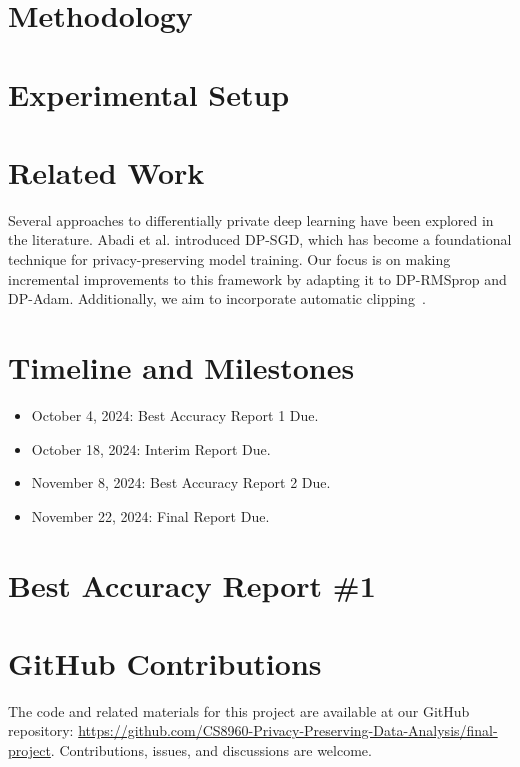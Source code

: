 \documentclass{article}
\begin{document}
    \section{Methodology}\label{sec:methodology}
    

    \break
    \section{Experimental Setup}\label{sec:experimental-setup}
    

    \section{Related Work}\label{sec:related-work}
    Several approaches to differentially private deep learning have been explored in the literature.
    Abadi et al. \cite{Abadi_2016_DeepLearningDifferentialPrivacy} introduced DP-SGD, which has become a foundational technique for
    privacy-preserving model training.
    Our focus is on making incremental improvements to this framework by adapting it to DP-RMSprop and DP-Adam.
    Additionally, we aim to incorporate automatic clipping~\cite{bu2023automaticclippingdifferentiallyprivate}.


    \section{Timeline and Milestones}\label{sec:timeline-and-milestones}
    \begin{itemize}
        \item October 4, 2024: Best Accuracy Report 1 Due.
        \item October 18, 2024: Interim Report Due.
        \item November 8, 2024: Best Accuracy Report 2 Due.
        \item November 22, 2024: Final Report Due.
    \end{itemize}

    \section{Best Accuracy Report \#1}\label{sec:best-accuracy-report}
    

    
    

    \section*{GitHub Contributions}
    The code and related materials for this project are available at our GitHub repository:
    \url{https://github.com/CS8960-Privacy-Preserving-Data-Analysis/final-project}.
    Contributions, issues, and discussions are welcome.
\end{document}

